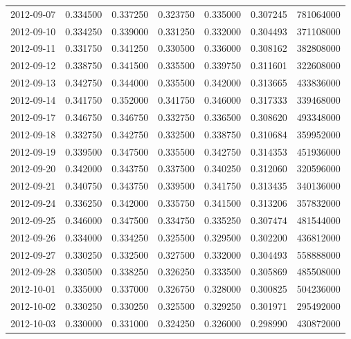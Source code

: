 \begin{tabular}{lrrrrrr}
2012-09-07 &    0.334500 &    0.337250 &    0.323750 &    0.335000 &    0.307245 &   781064000 \\
2012-09-10 &    0.334250 &    0.339000 &    0.331250 &    0.332000 &    0.304493 &   371108000 \\
2012-09-11 &    0.331750 &    0.341250 &    0.330500 &    0.336000 &    0.308162 &   382808000 \\
2012-09-12 &    0.338750 &    0.341500 &    0.335500 &    0.339750 &    0.311601 &   322608000 \\
2012-09-13 &    0.342750 &    0.344000 &    0.335500 &    0.342000 &    0.313665 &   433836000 \\
2012-09-14 &    0.341750 &    0.352000 &    0.341750 &    0.346000 &    0.317333 &   339468000 \\
2012-09-17 &    0.346750 &    0.346750 &    0.332750 &    0.336500 &    0.308620 &   493348000 \\
2012-09-18 &    0.332750 &    0.342750 &    0.332500 &    0.338750 &    0.310684 &   359952000 \\
2012-09-19 &    0.339500 &    0.347500 &    0.335500 &    0.342750 &    0.314353 &   451936000 \\
2012-09-20 &    0.342000 &    0.343750 &    0.337500 &    0.340250 &    0.312060 &   320596000 \\
2012-09-21 &    0.340750 &    0.343750 &    0.339500 &    0.341750 &    0.313435 &   340136000 \\
2012-09-24 &    0.336250 &    0.342000 &    0.335750 &    0.341500 &    0.313206 &   357832000 \\
2012-09-25 &    0.346000 &    0.347500 &    0.334750 &    0.335250 &    0.307474 &   481544000 \\
2012-09-26 &    0.334000 &    0.334250 &    0.325500 &    0.329500 &    0.302200 &   436812000 \\
2012-09-27 &    0.330250 &    0.332500 &    0.327500 &    0.332000 &    0.304493 &   558888000 \\
2012-09-28 &    0.330500 &    0.338250 &    0.326250 &    0.333500 &    0.305869 &   485508000 \\
2012-10-01 &    0.335000 &    0.337000 &    0.326750 &    0.328000 &    0.300825 &   504236000 \\
2012-10-02 &    0.330250 &    0.330250 &    0.325500 &    0.329250 &    0.301971 &   295492000 \\
2012-10-03 &    0.330000 &    0.331000 &    0.324250 &    0.326000 &    0.298990 &   430872000 \\

\end{tabular}
